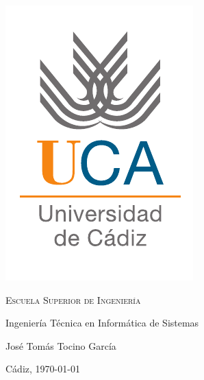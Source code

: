 \begin{titlepage}
  \centering
  \includegraphics[width=.3\textwidth]{logo_uca}

  \bigskip
  \bigskip
  \bigskip
  
    \centering

    {\Huge \textsc{\nohyphens{Escuela Superior de Ingeniería}}}
    
    \bigskip
    \bigskip
    \bigskip

    {\huge \nohyphens{Ingeniería Técnica en Informática de Sistemas}}

    \bigskip
    \bigskip
    \bigskip
    \bigskip
    \bigskip
    \bigskip

    {\LARGE \nohyphens{\nombreProyecto}}

    \bigskip
    \bigskip
    \bigskip
    \bigskip

    \bigskip
    \bigskip
    \bigskip
    \bigskip
    \bigskip
    \bigskip
    \bigskip
      

  {\Large José Tomás Tocino García \\}

  \bigskip

  {\large Cádiz, \today}

\end{titlepage}